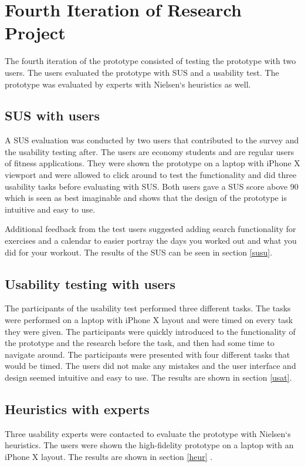 \section{Fourth Iteration of Research Project}
The fourth iteration of the prototype consisted of testing the prototype with two users. The users evaluated the prototype with SUS and a usability test. The prototype was evaluated by experts with Nielsen`s heuristics as well.

\subsection{SUS with users} \label{suswithuseros}
A SUS evaluation was conducted by two users that contributed to the survey and the usability testing after. The users are economy students and are regular users of fitness applications.
They were shown the prototype on a laptop with iPhone X viewport and were allowed to click around to test the functionality and did three usability tasks before evaluating with SUS. Both users gave a SUS score above 90 which is seen as best imaginable and shows that the design of the prototype is intuitive and easy to use.

Additional feedback from the test users suggested adding search functionality for exercises and a calendar to easier portray the days you worked out and what you did for your workout. The results of the SUS can be seen in section \ref{susu}.

\subsection{Usability testing with users} \label{usabilitytestusers}
The participants of the usability test performed three different tasks. The tasks were performed on a laptop with iPhone X layout and were timed on every task they were given. The participants were quickly introduced to the functionality of the prototype and the research before the task, and then had some time to navigate around. The participants were presented with four different tasks that would be timed.
The users did not make any mistakes and the user interface and design seemed intuitive and easy to use. The results are shown in section \ref{usat}.

\subsection{Heuristics with experts}
Three usability experts were contacted to evaluate the prototype with Nielsen`s heuristics. The users were shown the high-fidelity prototype on a laptop with an iPhone X layout. The results are shown in section \ref{heur} .


